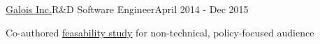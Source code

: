 \documentclass{article}
\newenvironment{**mylist}[4][]%
{%
\subsubsection*{%
    \censor{#2}\tabb #3%
    \if\relax\detokenize{#1}\relax
    \else
      {\;\;(#1)}%
    \fi
    \hfill #4%
}%

\small
  \begin{itemize}%
    \setlength{\topsep}{.2pt}%
    \setlength{\partopsep}{0pt}
    \setlength{\itemsep}{.6pt}%
    \setlength{\parskip}{0pt}%
    \setlength{\parsep}{0pt}%
}%
{%
  \end{itemize}%
}
\newcommand{\LU}[1]{\hspace{-1em}{\bf Technologies : #1}}
\begin{document}
\begin{**mylist}[Security]{\href{http://galois.com}{Galois Inc.}}{R\&D Software Engineer}{April 2014 - Dec 2015}
\item
  Co-authored  \href{https://usvotefoundation-drupal.s3.amazonaws.com/prod/E2EVIV_nontechnical_audience_report.pdf}{feasability study} for non-technical, policy-focused audience

\end{**mylist}

\end{document}
